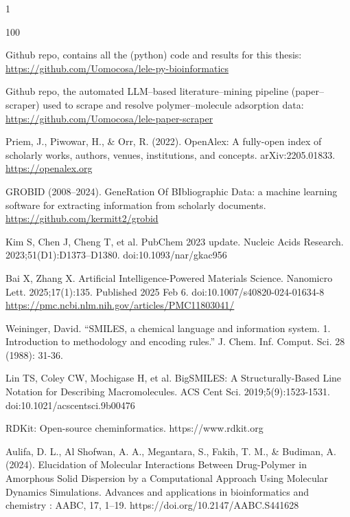 \begin{spacing}{1}
\begin{thebibliography}{100}


Github repo, contains all the (python) code and results for this thesis:
\url{https://github.com/Uomocosa/lele-py-bioinformatics}

Github repo, the automated LLM--based literature--mining pipeline (paper--scraper) used to scrape and resolve polymer--molecule adsorption data:
\url{https://github.com/Uomocosa/lele-paper-scraper}

Priem, J., Piwowar, H., \& Orr, R. (2022). OpenAlex: A fully-open index of scholarly works, authors, venues, institutions, and concepts. arXiv:2205.01833.
\url{https://openalex.org}

GROBID (2008--2024). GeneRation Of BIbliographic Data: a machine learning software for extracting information from scholarly documents.
\url{https://github.com/kermitt2/grobid}

Kim S, Chen J, Cheng T, et al. PubChem 2023 update. Nucleic Acids Research. 2023;51(D1):D1373--D1380. doi:10.1093/nar/gkac956

Bai X, Zhang X. Artificial Intelligence-Powered Materials Science. Nanomicro Lett. 2025;17(1):135. Published 2025 Feb 6. doi:10.1007/s40820-024-01634-8
\url{https://pmc.ncbi.nlm.nih.gov/articles/PMC11803041/}

Weininger, David. “SMILES, a chemical language and information system. 1. Introduction to methodology and encoding rules.” J. Chem. Inf. Comput. Sci. 28 (1988): 31-36.

Lin TS, Coley CW, Mochigase H, et al. BigSMILES: A Structurally-Based Line Notation for Describing Macromolecules. ACS Cent Sci. 2019;5(9):1523-1531. doi:10.1021/acscentsci.9b00476

RDKit: Open-source cheminformatics. https://www.rdkit.org

Aulifa, D. L., Al Shofwan, A. A., Megantara, S., Fakih, T. M., \& Budiman, A. (2024). Elucidation of Molecular Interactions Between Drug-Polymer in Amorphous Solid Dispersion by a Computational Approach Using Molecular Dynamics Simulations. Advances and applications in bioinformatics and chemistry : AABC, 17, 1–19. https://doi.org/10.2147/AABC.S441628


\end{thebibliography}
\end{spacing}
